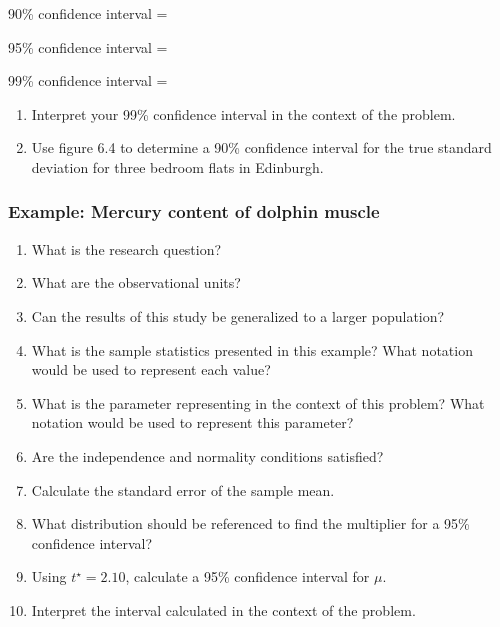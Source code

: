 \documentclass[
]{report}
\newcommand{\rgs}{\vspace{12pt}} %
\newcommand{\rgi}{\hspace{24pt}}  %
\begin{document}
\rgi 90\% confidence interval =
\rgs 

\rgi 95\% confidence interval =
\rgs 

\rgi 99\% confidence interval =
\rgs 

\begin{enumerate}
\def\labelenumi{\arabic{enumi}.}
\setcounter{enumi}{6}
\item
  Interpret your 99\% confidence interval in the context of the problem.
  \rgs 
  \rgs 
\item
  Use figure 6.4 to determine a 90\% confidence interval for the true standard deviation for three bedroom flats in Edinburgh.
  \rgs 
\end{enumerate}

\hypertarget{example-mercury-content-of-dolphin-muscle}{%
\subsubsection*{Example: Mercury content of dolphin muscle}\label{example-mercury-content-of-dolphin-muscle}}

\begin{enumerate}
\def\labelenumi{\arabic{enumi}.}
\item
  What is the research question?
  \rgs 
\item
  What are the observational units?
  \rgs 
\item
  Can the results of this study be generalized to a larger population?
  \rgs 
\item
  What is the sample statistics presented in this example? What notation would be used to represent each value?
  \rgs 
\item
  What is the parameter representing in the context of this problem? What notation would be used to represent this parameter?
  \rgs 
  \rgs 
\item
  Are the independence and normality conditions satisfied?
  \rgs 
  \rgs 
\item
  Calculate the standard error of the sample mean.
  \rgs 
\item
  What distribution should be referenced to find the multiplier for a 95\% confidence interval?
  \rgs 
\item
  Using \(t^\star=2.10\), calculate a 95\% confidence interval for \(\mu\).
  \rgs 
\item
  Interpret the interval calculated in the context of the problem.
  \rgs 
  \rgs 
\end{enumerate}
\end{document}
